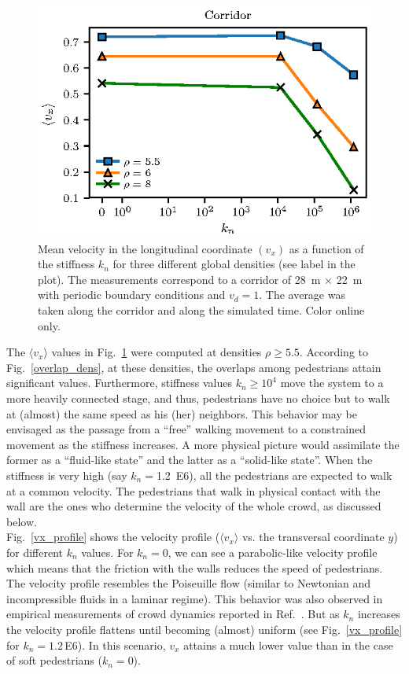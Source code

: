 \documentclass[preprint,12pt]{elsarticle}
\begin{document}
\begin{figure}[htbp!]
\centering
\includegraphics[width=0.7\columnwidth]{./kn_vs_vx_corridor.eps}
\caption{\label{kn_vs_vx_corridor} Mean velocity in the longitudinal coordinate
$(v_x)$ as a function of the stiffness $k_n$ for three different global 
densities (see label in the plot). The measurements correspond to a corridor of 
28~m $\times$ 22~m with periodic boundary conditions and $v_d=1$. The average 
was taken along the corridor and along the simulated time. Color online only.}
\end{figure}

The $\langle v_x\rangle$ values in Fig.~\ref{kn_vs_vx_corridor}  were computed
at densities $\rho\geq 5.5$. According to  Fig.~\ref{overlap_dens}, at these
densities, the overlaps among pedestrians attain significant values.
Furthermore,  stiffness values $k_n\geq 10^4$ move the system to a more heavily
connected  stage, and thus, pedestrians have no choice but to walk at  (almost)
the same speed as his (her) neighbors. This  behavior may be envisaged as the
passage from a ``free''  walking movement to a  constrained movement as the
stiffness increases. A more  physical picture would assimilate the former as a
``fluid-like  state'' and the latter as a ``solid-like state''. When the
stiffness is  very high (say $k_n=$1.2~E6), all the pedestrians  are expected to
walk at a common velocity. The  pedestrians that walk in physical contact with
the wall are the ones who  determine the velocity of the whole crowd, as
discussed  below.\\

Fig.~\ref{vx_profile} shows the velocity profile ($\langle v_x \rangle$ vs. the
transversal coordinate $y$) for different $k_n$ values. For $k_n=0$, we can see
a parabolic-like velocity profile which means that the friction with the walls
reduces the speed of pedestrians. The velocity profile resembles the Poiseuille
flow (similar to Newtonian and incompressible fluids in a laminar regime). This
behavior was also observed in empirical measurements of crowd dynamics reported
in Ref.~\cite{zhang2013empirical}. But as $k_n$ increases the velocity profile
flattens until becoming (almost) uniform (see Fig.~\ref{vx_profile} for
$k_n=1.2\,$E6). In this scenario, $v_x$ attains a much lower  value  than in the
case of soft pedestrians ($k_n=$0).\\
\end{document}
